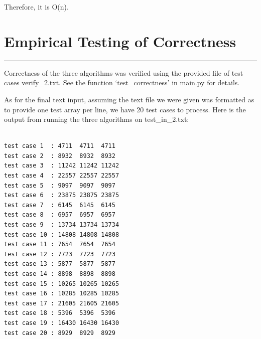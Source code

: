 \documentclass[letterpaper,10pt,titlepage,fleqn]{article}
\begin{document}
Therefore, it is O(n).

\section*{Empirical Testing of Correctness}
\hrule

Correctness of the three algorithms was verified using the provided file of test cases verify\_2.txt. See the function `test\_correctness' in main.py for details. 

As for the final text input, assuming the text file we were given was formatted as to provide one test array per line, we have 20 test cases to process. Here is the output from running the three algorithms on test\_in\_2.txt:

\begin{lstlisting}

test case 1  : 4711  4711  4711
test case 2  : 8932  8932  8932
test case 3  : 11242 11242 11242
test case 4  : 22557 22557 22557
test case 5  : 9097  9097  9097
test case 6  : 23875 23875 23875
test case 7  : 6145  6145  6145
test case 8  : 6957  6957  6957
test case 9  : 13734 13734 13734
test case 10 : 14808 14808 14808
test case 11 : 7654  7654  7654
test case 12 : 7723  7723  7723
test case 13 : 5877  5877  5877
test case 14 : 8898  8898  8898
test case 15 : 10265 10265 10265
test case 16 : 10285 10285 10285
test case 17 : 21605 21605 21605
test case 18 : 5396  5396  5396
test case 19 : 16430 16430 16430
test case 20 : 8929  8929  8929

\end{lstlisting}

\newpage
\end{document}
